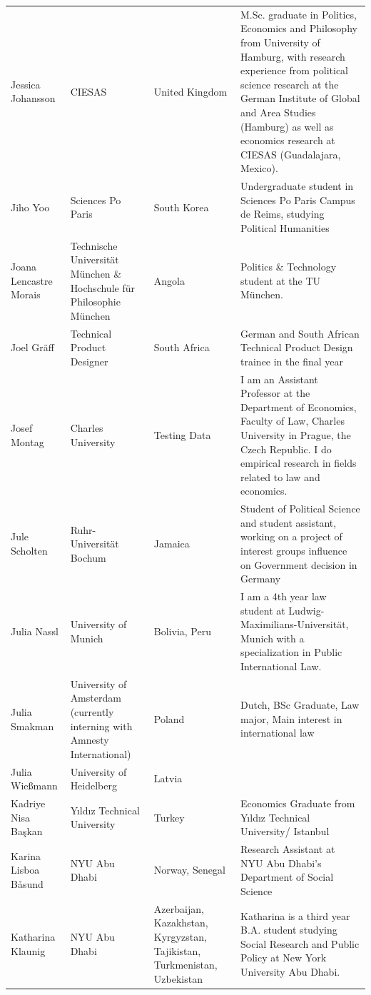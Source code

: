 \documentclass[]{article}
\begin{document}
\begin{longtable}{l>{\raggedright\arraybackslash}p{2cm}>{\raggedright\arraybackslash}p{2cm}>{\raggedright\arraybackslash}p{3cm}}
Jessica Johansson & CIESAS & United Kingdom & M.Sc. graduate in Politics, Economics and Philosophy from University of Hamburg, with research experience from political science research at the German Institute of Global and Area Studies (Hamburg) as well as economics research at CIESAS (Guadalajara, Mexico).\\
\rowcolor{gray!6}  Jiho Yoo & Sciences Po Paris & South Korea & Undergraduate student in Sciences Po Paris Campus de Reims, studying Political Humanities\\
Joana Lencastre Morais & Technische Universität München \& Hochschule für Philosophie München & Angola & Politics \& Technology student at the TU München.\\
\addlinespace
\rowcolor{gray!6}  Joel Gräff & Technical Product Designer & South Africa & German and South African Technical Product Design trainee in the final year\\
Josef Montag & Charles University & Testing Data & I am an Assistant Professor at the Department of Economics, Faculty of Law, Charles University in Prague, the Czech Republic. I do empirical research in fields related to law and economics.\\
\rowcolor{gray!6}  Jule Scholten & Ruhr-Universität Bochum & Jamaica & Student of Political Science and student assistant, working on a project of interest groups influence on Government decision in Germany\\
Julia Nassl & University of Munich & Bolivia, Peru & I am a 4th year law student at Ludwig-Maximilians-Universität, Munich with a specialization in Public International Law.\\
\rowcolor{gray!6}  Julia Smakman & University of Amsterdam (currently interning with Amnesty International) & Poland & Dutch, BSc Graduate, Law major, Main interest in international law\\
\addlinespace
Julia Wießmann & University of Heidelberg & Latvia & \\
\rowcolor{gray!6}  Kadriye Nisa Başkan & Yıldız Technical University & Turkey & Economics Graduate from Yıldız Technical University/ Istanbul\\
Karina Lisboa Båsund & NYU Abu Dhabi & Norway, Senegal & Research Assistant at NYU Abu Dhabi's Department of Social Science\\
\rowcolor{gray!6}  Katharina Klaunig & NYU Abu Dhabi & Azerbaijan, Kazakhstan, Kyrgyzstan, Tajikistan, Turkmenistan, Uzbekistan & Katharina is a third year B.A. student studying Social Research and Public Policy at New York University Abu Dhabi.\\

\end{longtable}
\end{document}
